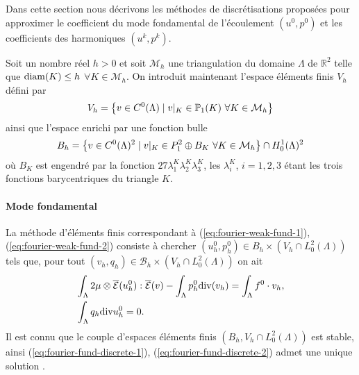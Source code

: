 Dans cette section nous décrivons les méthodes de discrétisations
proposées pour approximer le coefficient du mode fondamental de
l'écoulement $(u^0, p^0)$ et les coefficients des harmoniques $(u^k,
p^k)$.

Soit un nombre réel $h > 0$ et soit $\mathcal M_h$ une triangulation
du domaine $\Lambda$ de $\mathbb R^2$ telle que $\operatorname{diam}(K)\leq h$
$\forall K\in \mathcal M_h$. On introduit maintenant l'espace
éléments finis $V_h$ défini par
\begin{equation}
  V_h = \left\{ v\in C^0(\Lambda)\mid v|_K \in \mathbb
    P_1(K)\ \forall K\in\mathcal M_h \right\}
\end{equation}
ainsi que l'espace enrichi par une fonction bulle
\begin{equation}
  B_h = \left\{ v \in C^0(\Lambda)^2 \mid v|_K \in P_1^2\oplus
    B_K\ \forall K\in\mathcal M_h \right\} \cap H_0^1(\Lambda)^2
\end{equation}
où $B_K$ est engendré par la fonction $27 \lambda_1^K
\lambda_2^K\lambda_3^K$, les $\lambda_i^K$, $i = 1,2,3$ étant les
trois fonctions barycentriques du triangle $K$.

\paragraph{Mode fondamental}
La méthode d'éléments finis correspondant à
(\ref{eq:fourier-weak-fund-1}), (\ref{eq:fourier-weak-fund-2})
consiste à chercher $(u^0_h, p^0_h)\in B_h\times(V_h \cap
L^2_0(\Lambda))$ tels que, pour tout $(v_h, q_h)\in \mathcal
B_h\times(V_h \cap L^2_0(\Lambda))$ on ait
\begin{align}
  &\int_\Lambda
  2\mu\otimes\overline{\mathcal E}(u^0_h):\overline{\mathcal E}(v)
  -\int_\Lambda p^0_h\mathrm{div}(v_h) = \int_\Lambda f^0\cdot v_h, \label{eq:fourier-fund-discrete-1}\\
  & \int_\Lambda q_h\mathrm{div} u^0_h = 0.\label{eq:fourier-fund-discrete-2}
\end{align}
Il est connu que le couple d'espaces éléments finis $(B_h, V_h \cap
L^2_0(\Lambda))$ est stable, ainsi (\ref{eq:fourier-fund-discrete-1}),
(\ref{eq:fourier-fund-discrete-2}) admet une unique solution \cite{Temam1977}.

